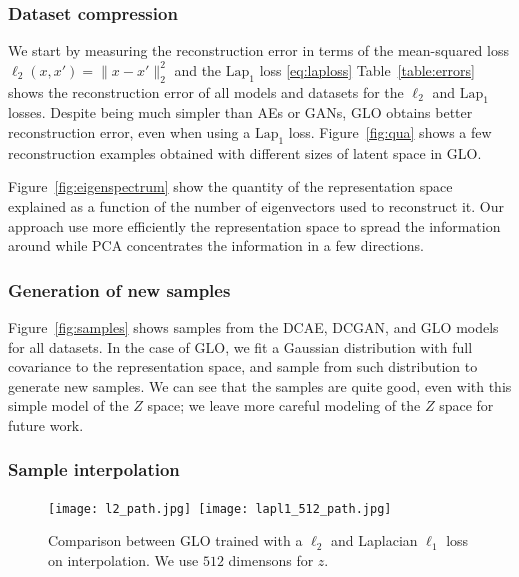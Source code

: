 \documentclass{article}
\newcommand{\GNAT}{GLO}
\begin{document}
\subsubsection{Dataset compression}\label{sec:experiments:compression}

We start by measuring the reconstruction error in terms of the mean-squared
loss $\ell_2(x,x') = \| x - x' \|_2^2$ and the $\text{Lap}_1$ loss
\eqref{eq:laploss}
%
Table~\ref{table:errors} shows the reconstruction error of all models and
datasets for the $\ell_2$ and $\text{Lap}_1$ losses.
Despite being much simpler than AEs or GANs, \GNAT{} obtains better reconstruction error, even when using a $\text{Lap}_1$ loss.
Figure~\ref{fig:qua} shows a few reconstruction examples obtained with different sizes of latent space in \GNAT{}.

Figure~\ref{fig:eigenspectrum} show the quantity of the representation space explained as a function of the number of eigenvectors
used to reconstruct it. Our approach use more efficiently the representation space to spread the information around while PCA
concentrates the information in a few directions.

\subsubsection{Generation of new samples}\label{sec:experiments:generation}

Figure~\ref{fig:samples} shows samples from the DCAE, DCGAN, and \GNAT{} models for all
datasets. In the case of \GNAT{}, we fit a Gaussian distribution with full
covariance to the representation space, and sample from such distribution to
generate new samples.  We can see that the samples are quite good, even with this simple model of the $Z$ space; we leave more careful modeling
of the $Z$ space for future work.
\subsubsection{Sample interpolation}\label{sec:experiments:interpolation}
\begin{figure}[t]
    \begin{center}
        \texttt{[image: l2\_path.jpg]}\        \texttt{[image: lapl1\_512\_path.jpg]}
    \end{center}
    \caption{Comparison between \GNAT{} trained with a $\ell_2$ and Laplacian $\ell_1$ loss on interpolation. We use $512$ dimensons for $z$.}
    \label{fig:comp22}
\end{figure}
\end{document}
